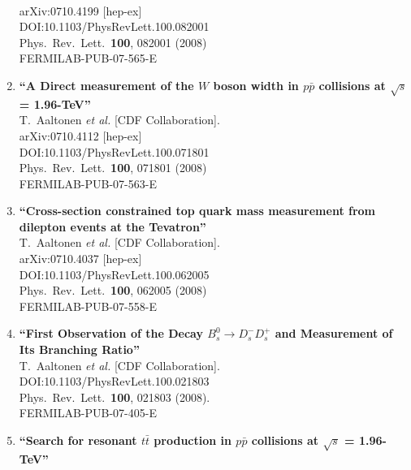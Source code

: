 \documentclass{article}
\begin{document}
\begin{enumerate}
  \\{}arXiv:0710.4199 [hep-ex]
  \\{}DOI:10.1103/PhysRevLett.100.082001
  \\{}Phys.\ Rev.\ Lett.\  {\bf 100}, 082001 (2008)
  \\{}FERMILAB-PUB-07-565-E
\item%
{\bf ``A Direct measurement of the $W$ boson width in $p \bar{p}$ collisions at $\sqrt{s}$ = 1.96-TeV''}
  \\{}T.~Aaltonen {\it et al.} [CDF Collaboration].
  \\{}arXiv:0710.4112 [hep-ex]
  \\{}DOI:10.1103/PhysRevLett.100.071801
  \\{}Phys.\ Rev.\ Lett.\  {\bf 100}, 071801 (2008)
  \\{}FERMILAB-PUB-07-563-E
\item%
{\bf ``Cross-section constrained top quark mass measurement from dilepton events at the Tevatron''}
  \\{}T.~Aaltonen {\it et al.} [CDF Collaboration].
  \\{}arXiv:0710.4037 [hep-ex]
  \\{}DOI:10.1103/PhysRevLett.100.062005
  \\{}Phys.\ Rev.\ Lett.\  {\bf 100}, 062005 (2008)
  \\{}FERMILAB-PUB-07-558-E
\item%
{\bf ``First Observation of the Decay $B_s^0 \to D_s^- D_s^+$ and Measurement of Its Branching Ratio''}
  \\{}T.~Aaltonen {\it et al.} [CDF Collaboration].
  \\{}DOI:10.1103/PhysRevLett.100.021803
  \\{}Phys.\ Rev.\ Lett.\  {\bf 100}, 021803 (2008).
  \\{}FERMILAB-PUB-07-405-E
\item%
{\bf ``Search for resonant $t \bar{t}$ production in $p \bar{p}$ collisions at $\sqrt{s}$ = 1.96-TeV''}

\end{enumerate}
\end{document}
